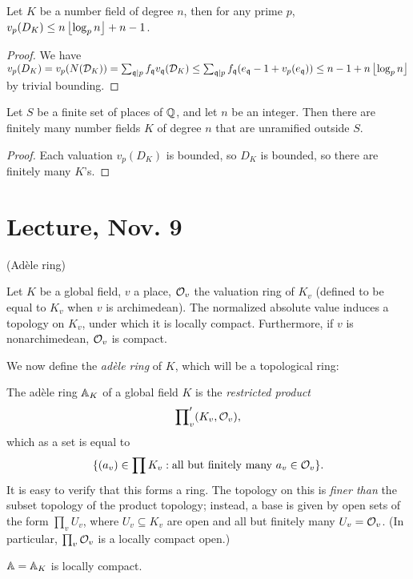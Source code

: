 \documentclass[11pt]{amsart}
\begin{document}
\begin{lem}
Let $K$ be a number field of degree $n$, then for any prime $p$, $v_p(D_K) \le n\floor{\log_p n} + n - 1$. 
\end{lem}

\begin{proof}
We have $v_p(D_K) = v_p(N(\cD_K)) = \sum_{\fq\mid p} f_{\fq}v_{\fq}(\cD_K) \le \sum_{\fq\mid p} f_{\fq}(e_{\fq}-1+v_p(e_{\fq}))\le n-1+n\floor{\log_p n}$ by trivial bounding.
\end{proof}


\begin{thm}[Hermite]
Let $S$ be a finite set of places of $\QQ$, and let $n$ be an integer. Then there are finitely many number fields $K$ of degree $n$ that are unramified outside $S$.
\end{thm}

\begin{proof}
Each valuation $v_p(D_K)$ is bounded, so $D_K$ is bounded, so there are finitely many $K$'s.
\end{proof}


\section{Lecture, Nov. 9}

(Ad\`ele ring)


Let $K$ be a global field, $v$ a place, $\cO_v$ the valuation ring of $K_v$ (defined to be equal to $K_v$ when $v$ is archimedean). The normalized absolute value induces a topology on $K_v$, under which it is locally compact. Furthermore, if $v$ is nonarchimedean, $\cO_v$ is compact.

We now define the \emph{ad\`ele ring} of $K$, which will be a topological ring:

\begin{defn}
The ad\`ele ring $\AA_K$ of a global field $K$ is the \emph{restricted product}
\[\prod\nolimits_v ' (K_v, \cO_v),\]
which as a set is equal to
\[\{(a_v)\in \prod K_v: \text{all but finitely many } a_v\in \cO_v\}.\]
It is easy to verify that this forms a ring. The topology on this is \emph{finer than} the subset topology of the product topology; instead, a base is given by open sets of the form $\prod_v U_v$, where $U_v\subseteq K_v$ are open and all but finitely many $U_v = \cO_v$. (In particular, $\prod_v \cO_v$ is a locally compact open.)
\end{defn}

\begin{prop}
$\AA = \AA_K$ is locally compact.
\end{prop}
\end{document}

